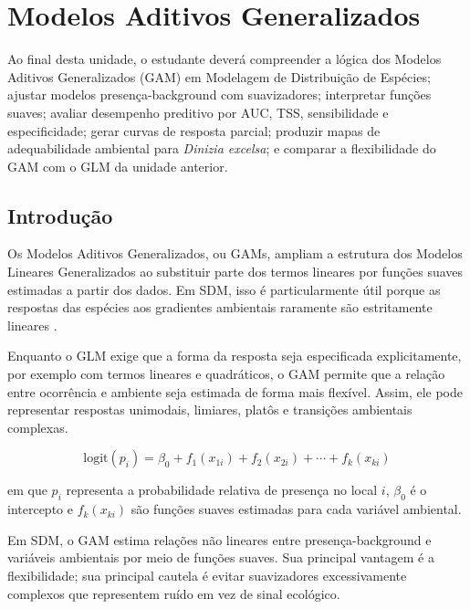 \chapter[GAM]{Modelos Aditivos Generalizados}

\begin{objetivos}
	Ao final desta unidade, o estudante deverá compreender a lógica dos Modelos Aditivos Generalizados (GAM) em Modelagem de Distribuição de Espécies; ajustar modelos presença-background com suavizadores; interpretar funções suaves; avaliar desempenho preditivo por AUC, TSS, sensibilidade e especificidade; gerar curvas de resposta parcial; produzir mapas de adequabilidade ambiental para \textit{Dinizia excelsa}; e comparar a flexibilidade do GAM com o GLM da unidade anterior.
\end{objetivos}

\section{Introdução}

Os Modelos Aditivos Generalizados, ou GAMs, ampliam a estrutura dos Modelos Lineares Generalizados ao substituir parte dos termos lineares por funções suaves estimadas a partir dos dados. Em SDM, isso é particularmente útil porque as respostas das espécies aos gradientes ambientais raramente são estritamente lineares \parencite{guisan2002,guisan2017habitat,wood2017generalized}.

Enquanto o GLM exige que a forma da resposta seja especificada explicitamente, por exemplo com termos lineares e quadráticos, o GAM permite que a relação entre ocorrência e ambiente seja estimada de forma mais flexível. Assim, ele pode representar respostas unimodais, limiares, platôs e transições ambientais complexas.

\begin{equationbox}
	\[
	\text{logit}(p_i) =
	\beta_0 + f_1(x_{1i}) + f_2(x_{2i}) + \cdots + f_k(x_{ki})
	\]
\end{equationbox}

em que \(p_i\) representa a probabilidade relativa de presença no local \(i\), \(\beta_0\) é o intercepto e \(f_k(x_{ki})\) são funções suaves estimadas para cada variável ambiental.

\begin{conceito}[title={\faBook\quad GAM em SDM}]
	Em SDM, o GAM estima relações não lineares entre presença-background e variáveis ambientais por meio de funções suaves. Sua principal vantagem é a flexibilidade; sua principal cautela é evitar suavizadores excessivamente complexos que representem ruído em vez de sinal ecológico.
\end{conceito}

